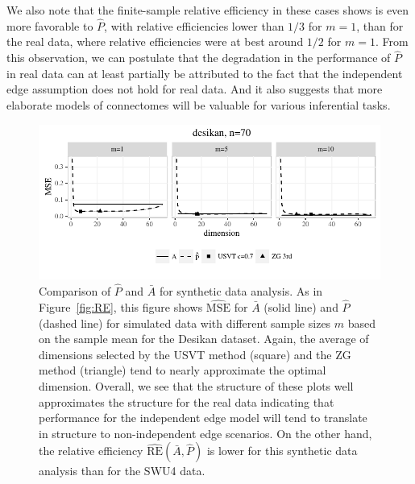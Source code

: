 We also note that the finite-sample relative efficiency in these cases shows is even more favorable to $\hat{P}$, with relative efficiencies lower than $1/3$ for $m=1$, than for the real data, where relative efficiencies were at best around $1/2$ for $m=1$.
From this observation, we can postulate that the degradation in the performance of $\hat{P}$ in real data can at least partially be attributed to the fact that the independent edge assumption does not hold for real data. And it also suggests that more elaborate models of connectomes will be valuable for various inferential tasks.


\begin{figure}
\centering
\includegraphics[width=1\textwidth]{./Figures/sim_desikan.pdf}
\caption[Comparison of two estimators for synthetic data analysis]{Comparison of $\hat{P}$ and $\bar{A}$ for synthetic data analysis.
As in Figure~\ref{fig:RE}, this figure shows $\hat{\mathrm{MSE}}$ for $\bar{A}$ (solid line) and $\hat{P}$ (dashed line) for simulated data with different sample sizes $m$ based on the sample mean for the Desikan dataset. Again, the average of dimensions selected by the USVT method (square) and the ZG method (triangle) tend to nearly approximate the optimal dimension. 
Overall, we see that the structure of these plots well approximates the structure for the real data indicating that performance for the independent edge model will tend to translate in structure to non-independent edge scenarios. 
On the other hand, the relative efficiency $\hat{\mathrm{RE}}(\bar{A},\hat{P})$ is lower for this synthetic data analysis than for the SWU4 data.}
\label{fig:sim_desikan}
\end{figure}




